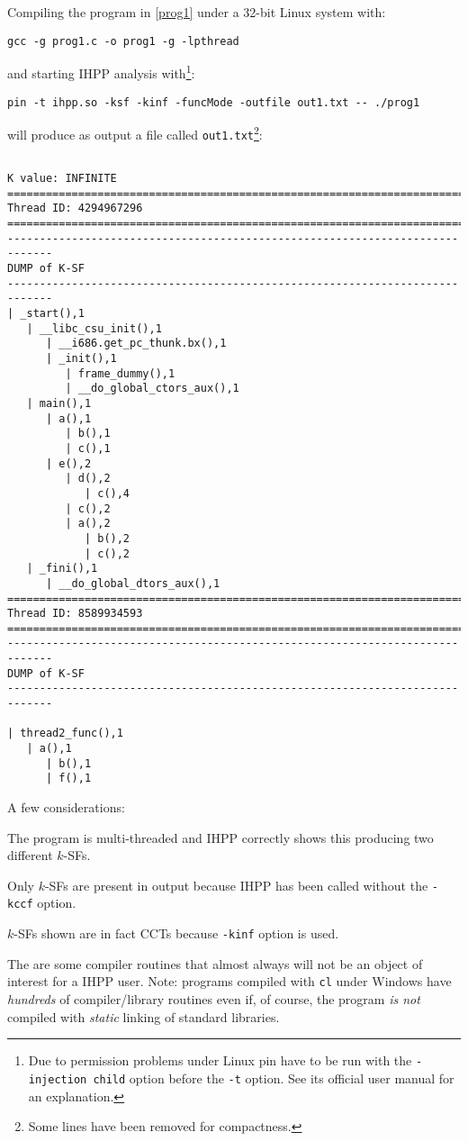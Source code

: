 \documentclass[a4paper,10pt]{report}
\begin{document}
\noindent
Compiling the program in \cref{prog1} under a 32-bit Linux system with:
\begin{center}
\verb|gcc -g prog1.c -o prog1 -g -lpthread|
\end{center}
and starting IHPP analysis with\footnote{Due to permission problems under Linux pin have to be run with the \texttt{-injection child} option before the \texttt{-t} option. See its official user manual for an explanation.}:
\begin{center}
\begin{verbatim}
pin -t ihpp.so -ksf -kinf -funcMode -outfile out1.txt -- ./prog1
\end{verbatim}
\end{center}

\noindent
will produce as output a file called \verb|out1.txt|\footnote{Some lines have been removed for compactness.}:

\begin{lstlisting}[label=out1, caption=file out1.txt]

K value: INFINITE
=============================================================================
Thread ID: 4294967296
=============================================================================
-----------------------------------------------------------------------------
DUMP of K-SF
-----------------------------------------------------------------------------
| _start(),1
   | __libc_csu_init(),1
      | __i686.get_pc_thunk.bx(),1
      | _init(),1
         | frame_dummy(),1
         | __do_global_ctors_aux(),1
   | main(),1
      | a(),1
         | b(),1
         | c(),1
      | e(),2
         | d(),2
            | c(),4
         | c(),2
         | a(),2
            | b(),2
            | c(),2
   | _fini(),1
      | __do_global_dtors_aux(),1
=============================================================================
Thread ID: 8589934593
=============================================================================
-----------------------------------------------------------------------------
DUMP of K-SF
-----------------------------------------------------------------------------

| thread2_func(),1
   | a(),1
      | b(),1
      | f(),1
\end{lstlisting}


A few considerations:
\renewcommand{\labelitemi}{$-$}

\begin{itemize*}
\item The program is multi-threaded and IHPP correctly shows this
producing two different $k$-SFs.
\item Only $k$-SFs are present in output because IHPP has been called without the \verb|-kccf| option.
\item $k$-SFs shown are in fact CCTs because \verb|-kinf| option is used.
\item The are some compiler routines that almost always will not be an object of interest for a IHPP user. Note: programs compiled with \verb|cl| under Windows have \emph{hundreds} of compiler\slash library routines even if, of course, the program \emph{is not} compiled with \emph{static} linking of standard libraries.
\end{itemize*}
\end{document}
